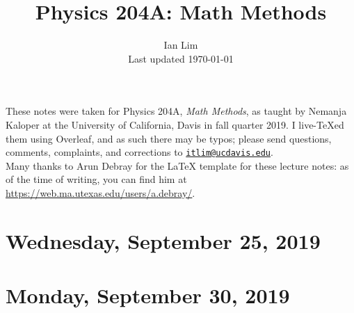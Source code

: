 \documentclass{../mynotes}
\begin{document}
\title{Physics 204A: Math Methods}
\author{Ian Lim\\ Last updated \today}
\maketitle
{\small\noindent These notes were taken for Physics 204A, \emph{Math Methods}, as taught by Nemanja Kaloper at the University of California, Davis in fall quarter 2019. I live-\TeX ed them using Overleaf, and as such there may be typos; please send questions, comments, complaints, and corrections to 
\href{mailto:itlim@ucdavis.edu?subject=204A\%20Lecture\%20Notes}{\texttt{itlim@ucdavis.edu}}.\\
Many thanks to Arun Debray for the {\LaTeX} template for these lecture notes: as of the time of writing, you can find him at \url{https://web.ma.utexas.edu/users/a.debray/}.}

\tableofcontents

\section{Wednesday, September 25, 2019}
	
	

\section{Monday, September 30, 2019}
    
\end{document}
